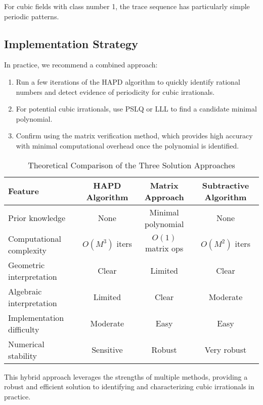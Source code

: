 \begin{corollary}\label{cor:class_number_one}
For cubic fields with class number 1, the trace sequence has particularly simple periodic patterns.
\end{corollary}

\subsection{Implementation Strategy}

In practice, we recommend a combined approach:
\begin{enumerate}
    \item Run a few iterations of the HAPD algorithm to quickly identify rational numbers and detect evidence of periodicity for cubic irrationals.
    \item For potential cubic irrationals, use PSLQ or LLL to find a candidate minimal polynomial.
    \item Confirm using the matrix verification method, which provides high accuracy with minimal computational overhead once the polynomial is identified.
\end{enumerate}

\begin{table}[htbp]
\centering
\begin{tabular}{|l|c|c|c|}
\hline
\textbf{Feature} & \textbf{HAPD Algorithm} & \textbf{Matrix Approach} & \textbf{Subtractive Algorithm} \\
\hline
Prior knowledge & None & Minimal polynomial & None \\
\hline
Computational complexity & $O(M^3)$ iters & $O(1)$ matrix ops & $O(M^2)$ iters \\
\hline
Geometric interpretation & Clear & Limited & Clear \\
\hline
Algebraic interpretation & Limited & Clear & Moderate \\
\hline
Implementation difficulty & Moderate & Easy & Easy \\
\hline
Numerical stability & Sensitive & Robust & Very robust \\
\hline
\end{tabular}
\caption{Theoretical Comparison of the Three Solution Approaches}
\label{tab:theoretical_comparison}
\end{table}

This hybrid approach leverages the strengths of multiple methods, providing a robust and efficient solution to identifying and characterizing cubic irrationals in practice.
